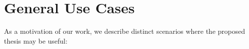 \section{General Use Cases}
As a motivation of our work, we describe distinct scenarios where the proposed thesis may be useful:








